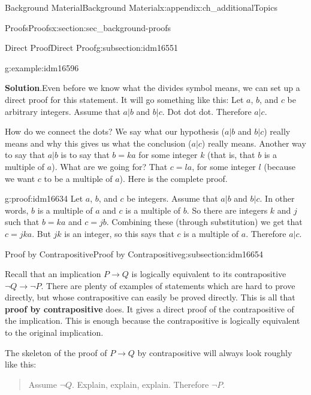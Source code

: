 \documentclass[oneside,10pt,]{book}
\newcommand{\terminology}[1]{\textbf{#1}}
\numberwithin{equation}{chapter}
\def\imp{\rightarrow}
\begin{document}
\begin{appendixptx}{Background Material}{}{Background Material}{}{}{x:appendix:ch_additionalTopics}
\begin{sectionptx}{Proofs}{}{Proofs}{}{}{x:section:sec_background-proofs}
\begin{subsectionptx}{Direct Proof}{}{Direct Proof}{}{}{g:subsection:idm16551}
\begin{example}{}{g:example:idm16596}
\par\smallskip%
\noindent\textbf{Solution}.\hypertarget{g:solution:idm16613}{}\quad{}Even before we know what the divides symbol means, we can set up a direct proof for this statement. It will go something like this: Let \(a\), \(b\), and \(c\) be arbitrary integers. Assume that \(a|b\) and \(b|c\). Dot dot dot. Therefore \(a|c\).%
\par
How do we connect the dots? We say what our hypothesis (\(a|b\) and \(b|c\)) really means and why this gives us what the conclusion (\(a|c\)) really means. Another way to say that \(a|b\) is to say that \(b = ka\) for some integer \(k\) (that is, that \(b\) is a multiple of \(a\)). What are we going for? That \(c = la\), for some integer \(l\) (because we want \(c\) to be a multiple of \(a\)). Here is the complete proof.%
\begin{proofptx}{}{g:proof:idm16634}
Let \(a\), \(b\), and \(c\) be integers. Assume that \(a|b\) and \(b|c\). In other words, \(b\) is a multiple of \(a\) and \(c\) is a multiple of \(b\). So there are integers \(k\) and \(j\) such that \(b = ka\) and \(c = jb\). Combining these (through substitution) we get that \(c = jka\). But \(jk\) is an integer, so this says that \(c\) is a multiple of \(a\). Therefore \(a|c\).%
\end{proofptx}
\end{example}
\end{subsectionptx}
%
%
\typeout{************************************************}
\typeout{************************************************}
%
\begin{subsectionptx}{Proof by Contrapositive}{}{Proof by Contrapositive}{}{}{g:subsection:idm16654}
%
\par
Recall that an implication \(P \imp Q\) is logically equivalent to its contrapositive \(\neg Q \imp \neg P\). There are plenty of examples of statements which are hard to prove directly, but whose contrapositive can easily be proved directly. This is all that \terminology{proof by contrapositive} does. It gives a direct proof of the contrapositive of the implication. This is enough because the contrapositive is logically equivalent to the original implication.%
\par
The skeleton of the proof of \(P \imp Q\) by contrapositive will always look roughly like this:%
\begin{quote}%
Assume \(\neg Q\). Explain, explain, \textellipsis{} explain. Therefore \(\neg P\).%

\end{quote}
\end{subsectionptx}
\end{sectionptx}
\end{appendixptx}
\end{document}
